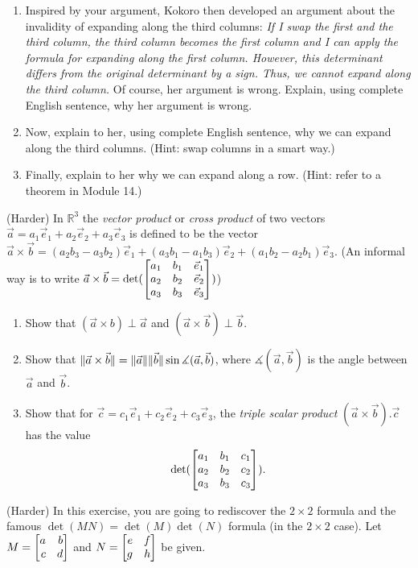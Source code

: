 \begin{exercises}
\begin{problist}
\begin{enumerate}
        \item Inspired by your argument, Kokoro then developed an argument about the invalidity of expanding along the third columns: \textit{If I swap the first and the third column, the third column becomes the first column and I can apply the formula for expanding along the first column. However, this determinant differs from the original determinant by a sign. Thus, we cannot expand along the third column.}
            Of course, her argument is wrong. Explain, using complete English sentence, why her argument is wrong.
        \item Now, explain to her, using complete English sentence, why we can expand along the third columns. (Hint: swap columns in a smart way.)
        \item Finally, explain to her why we can expand along a row. (Hint: refer to a theorem in Module 14.)
      \end{enumerate}
  \prob (Harder) In \(\mathbb{R}^3\) the \textit{vector product} or \textit{cross product} of two vectors \(\vec{a}=a_1\vec{e}_1+a_2\vec{e}_2+a_3\vec{e}_3\) is defined to be the vector \(\vec{a}\times \vec{b}=(a_2b_3-a_3b_2)\vec{e}_1+(a_3b_1-a_1b_3)\vec{e}_2+(a_1b_2-a_2b_1)\vec{e}_3\). (An informal way is to write \(\vec{a}\times \vec{b}=\det(\mat{a_1 & b_1 & \vec e_1 \\ a_2 & b_2 & \vec e_2 \\ a_3 & b_3 & \vec e_3})\))
      \begin{enumerate}
        \item Show that \((\vec{a}\times b)\perp\vec{a}\) and \((\vec{a}\times \vec{b})\perp \vec{b}\).
        \item Show that \(\lVert\vec{a}\times\vec{b}\rVert=\lVert\vec{a}\rVert\lVert\vec{b}\rVert\sin\measuredangle(\vec{a},\vec{b})\), where \(\measuredangle(\vec{a},\vec{b})\) is the angle between \(\vec{a}\) and \(\vec{b}\).
        \item Show that for \(\vec{c}=c_1\vec{e}_1+c_2\vec{e}_2+c_3\vec{e}_3\), the \textit{triple scalar product} \((\vec a\times \vec b). \vec c\) has the value \[\det(\mat{a_1 & b_1 & c_1 \\ a_2 & b_2 & c_2 \\ a_3 & b_3 & c_3}).\]
      \end{enumerate}
  \prob (Harder) In this exercise, you are going to rediscover the \(2\times 2\) formula and the famous \(\det(MN)=\det(M)\det(N)\) formula (in the \(2\times 2\) case). Let \(M=\mat{a & b \\ c & d}\) and \(N=\mat{e & f \\ g & h}\) be given.

\end{problist}
\end{exercises}
